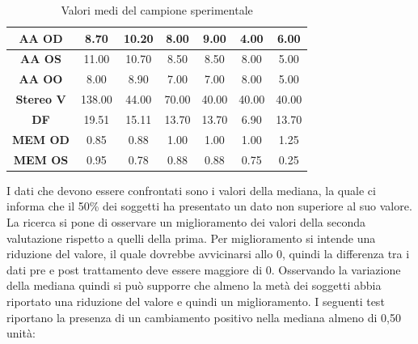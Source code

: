 \begin{table}[H]
\begin{center}
\begin{tabular}{|c|c|c|c|c|c|c|}
\textbf{AA OD} & 8.70 & 10.20 & 8.00 & 9.00 & 4.00 & 6.00 \\ \hline
\textbf{AA OS} & 11.00 & 10.70 & 8.50 & 8.50 & 8.00 & 5.00 \\ \hline
\textbf{AA OO} & 8.00 & 8.90 & 7.00 & 7.00 & 8.00 & 5.00\\ \hline
\textbf{Stereo V} & 138.00 & 44.00 & 70.00 & 40.00 & 40.00 & 40.00\\ \hline
\textbf{DF} & 19.51 & 15.11 & 13.70 & 13.70 & 6.90 & 13.70 \\ \hline
\textbf{MEM OD} & 0.85 & 0.88 & 1.00 & 1.00 & 1.00 & 1.25 \\ \hline
\textbf{MEM OS} & 0.95 & 0.78 & 0.88 & 0.88 & 0.75 & 0.25 \\ \hline

\hline
\end{tabular}
\end{center}
\caption{Valori medi del campione sperimentale}
\end{table}

I dati che devono essere confrontati sono i valori della mediana, la quale ci informa che il 50\% dei soggetti ha presentato un dato non superiore al suo valore. La ricerca si pone di osservare un miglioramento dei valori della seconda valutazione rispetto a quelli della prima. Per miglioramento si intende una riduzione del valore, il quale dovrebbe avvicinarsi allo 0, quindi la differenza tra i dati pre e post trattamento deve essere maggiore di 0. Osservando la variazione della mediana quindi si può supporre che almeno la metà dei soggetti abbia riportato una riduzione del valore e quindi un miglioramento. I seguenti test riportano la presenza di un cambiamento positivo nella mediana almeno di 0,50 unità:

